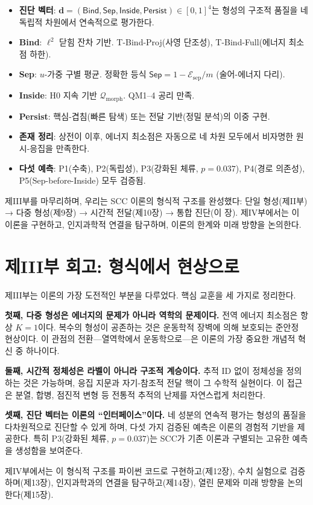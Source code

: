 \begin{itemize}
    \item \textbf{진단 벡터}: $\mathbf{d} = (\mathsf{Bind}, \mathsf{Sep}, \mathsf{Inside}, \mathsf{Persist}) \in [0,1]^4$는 형성의 구조적 품질을 네 독립적 차원에서 연속적으로 평가한다.

    \item \textbf{Bind}: $\ell^2$ 닫힘 잔차 기반. T-Bind-Proj(사영 단조성), T-Bind-Full(에너지 최소점 하한).

    \item \textbf{Sep}: $u$-가중 구별 평균. 정확한 등식 $\mathsf{Sep} = 1 - \mathcal{E}_{\mathrm{sep}}/m$ (술어-에너지 다리).

    \item \textbf{Inside}: H0 지속 기반 $\mathcal{Q}_{\mathrm{morph}}$. QM1--4 공리 만족.

    \item \textbf{Persist}: 핵심-겹침(빠른 탐색) 또는 전달 기반(정밀 분석)의 이중 구현.

    \item \textbf{존재 정리}: 상전이 이후, 에너지 최소점은 자동으로 네 차원 모두에서 비자명한 원시-응집을 만족한다.

    \item \textbf{다섯 예측}: P1(수축), P2(독립성), P3(강화된 체류, $p=0.037$), P4(경로 의존성), P5(Sep-before-Inside) 모두 검증됨.
\end{itemize}

제III부를 마무리하며, 우리는 SCC 이론의 형식적 구조를 완성했다: 단일 형성(제II부) → 다중 형성(제9장) → 시간적 전달(제10장) → 통합 진단(이 장). 제IV부에서는 이 이론을 구현하고, 인지과학적 연결을 탐구하며, 이론의 한계와 미래 방향을 논의한다.


\section*{제III부 회고: 형식에서 현상으로}

제III부는 이론의 가장 도전적인 부분을 다루었다. 핵심 교훈을 세 가지로 정리한다.

\textbf{첫째, 다중 형성은 에너지의 문제가 아니라 역학의 문제이다.} 전역 에너지 최소점은 항상 $K = 1$이다. 복수의 형성이 공존하는 것은 운동학적 장벽에 의해 보호되는 준안정 현상이다. 이 관점의 전환---열역학에서 운동학으로---은 이론의 가장 중요한 개념적 혁신 중 하나이다.

\textbf{둘째, 시간적 정체성은 라벨이 아니라 구조적 계승이다.} 추적 ID 없이 정체성을 정의하는 것은 가능하며, 응집 지문과 자기-참조적 전달 핵이 그 수학적 실현이다. 이 접근은 분열, 합병, 점진적 변형 등 전통적 추적의 난제를 자연스럽게 처리한다.

\textbf{셋째, 진단 벡터는 이론의 ``인터페이스''이다.} 네 성분의 연속적 평가는 형성의 품질을 다차원적으로 진단할 수 있게 하며, 다섯 가지 검증된 예측은 이론의 경험적 기반을 제공한다. 특히 P3(강화된 체류, $p = 0.037$)는 SCC가 기존 이론과 구별되는 고유한 예측을 생성함을 보여준다.

제IV부에서는 이 형식적 구조를 파이썬 코드로 구현하고(제12장), 수치 실험으로 검증하며(제13장), 인지과학과의 연결을 탐구하고(제14장), 열린 문제와 미래 방향을 논의한다(제15장).
